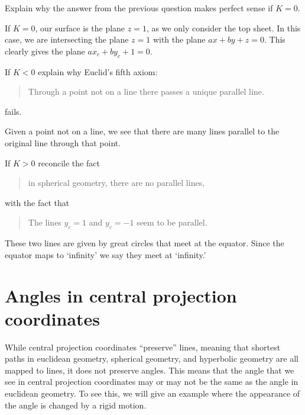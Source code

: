\documentclass{ximera}
\begin{document}
\begin{problem}
  Explain why the answer from the previous question makes perfect sense if $K=0$.
  \begin{freeResponse}
    If $K=0$, our surface is the plane $z=1$, as we only consider the
    top sheet. In this case, we are intersecting the plane $z=1$ with
    the plane $ax+by+z=0$. This clearly gives the plane $ax_c+ by_c +
    1 = 0.$
  \end{freeResponse}
\end{problem}

\begin{problem}
  If $K<0$ explain why Euclid's fifth axiom:
  \begin{quote}
    Through a point not on a line there passes a unique parallel line.
  \end{quote}
  fails.
  \begin{freeResponse}
    Given a point not on a line, we see that there are many lines
    parallel to the original line through that point.
  \end{freeResponse}
\end{problem}

\begin{problem}
  If $K>0$ reconcile the fact
  \begin{quote}
    in spherical geometry, there are no parallel lines,
  \end{quote}
  with the fact that 
  \begin{quote}
    The lines $y_c=1$ and $y_c = -1$ seem to be parallel.
  \end{quote}
  \begin{freeResponse}
    These two lines are given by great circles that meet at the
    equator. Since the equator maps to `infinity' we say they meet at
    `infinity.'
  \end{freeResponse}
\end{problem}

\section{Angles in central projection coordinates}

While central projection coordinates ``preserve'' lines, meaning that
shortest paths in euclidean geometry, spherical geometry, and
hyperbolic geometry are all mapped to lines, it does not preserve
angles. This means that the angle that we see in central projection
coordinates may or may not be the same as the angle in euclidean
geometry. To see this, we will give an example where the appearance of
the angle is changed by a rigid motion.
\end{document}
